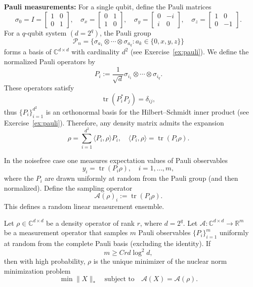 \medskip
\noindent
\textbf{Pauli measurements:} For a single qubit, define the Pauli matrices~\cite{nielsen2010quantum,gross2011recovering}
$$
\sigma_0 = I =
\begin{bmatrix}
1 & 0\\
0 & 1
\end{bmatrix},\quad
\sigma_x =
\begin{bmatrix}
0 & 1\\
1 & 0
\end{bmatrix},\quad
\sigma_y =
\begin{bmatrix}
0 & -i\\
i & 0
\end{bmatrix},\quad
\sigma_z =
\begin{bmatrix}
1 & 0\\
0 & -1
\end{bmatrix}.
$$
For a $q$-qubit system $(d = 2^q)$, the Pauli group
$$
\mathcal{P}_n = \big\{ \sigma_{a_1} \otimes \cdots \otimes \sigma_{a_q} : a_k \in \{0,x,y,z\} \big\}
$$
forms a basis of $\mathbb{C}^{d\times d}$ with cardinality $d^2$ (see Exercise~\ref{ex:pauli}).
We define the normalized Pauli operators by
$$
P_i := \frac{1}{\sqrt{d}} \sigma_{i_1} \otimes \cdots \otimes \sigma_{i_q}.
$$
These operators satisfy
$$
\operatorname{tr}(P_i^\ast P_j) = \delta_{ij},
$$
thus $\{P_i\}_{i=1}^{d^2}$ is an orthonormal basis for the Hilbert–Schmidt inner product (see Exercise~\ref{ex:pauli}).
Therefore, any density matrix admits the expansion
$$
\rho = \sum_{i=1}^{d^2} \langle P_i, \rho \rangle P_i,
\quad
\langle P_i, \rho \rangle = \operatorname{tr}(P_i \rho).
$$

In the noisefree case one measures expectation values of Pauli observables
$$
y_i = \operatorname{tr}(P_{i} \rho),
\quad i=1,\dots,m,
$$
where the $P_i$ are drawn uniformly at random from the Pauli group (and then normalized). Define the sampling operator
$$
\mathcal{A}(\rho)_i := \operatorname{tr}(P_{i} \rho).
$$
This defines a random linear measurement ensemble.



\begin{theorem}\label{th:QST}
Let $\rho \in \mathbb{C}^{d \times d}$ be a density operator of rank $r$, where $d=2^q$. Let $\mathcal{A}: \mathbb{C}^{d \times d} \to \mathbb{R}^m$ be a measurement operator that samples $m$ Pauli observables $\{P_i\}_{i=1}^m$ uniformly at random from the complete Pauli basis (excluding the identity). If
$$m \ge C rd \log^2 d,$$
then with high probability, $\rho$ is the unique minimizer of the nuclear norm minimization problem
$$\min \|X\|_* \quad \text{subject to} \quad \mathcal{A}(X) = \mathcal{A}(\rho).$$    
\end{theorem}

